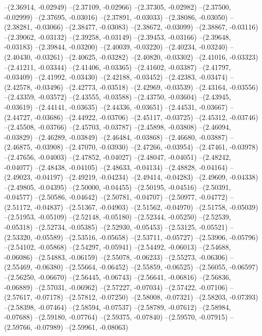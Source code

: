 --(2.36914, -0.02949)
--(2.37109, -0.02966)
--(2.37305, -0.02982)
--(2.37500, -0.02999)
--(2.37695, -0.03016)
--(2.37891, -0.03033)
--(2.38086, -0.03050)
--(2.38281, -0.03066)
--(2.38477, -0.03083)
--(2.38672, -0.03099)
--(2.38867, -0.03116)
--(2.39062, -0.03132)
--(2.39258, -0.03149)
--(2.39453, -0.03166)
--(2.39648, -0.03183)
--(2.39844, -0.03200)
--(2.40039, -0.03220)
--(2.40234, -0.03240)
--(2.40430, -0.03261)
--(2.40625, -0.03282)
--(2.40820, -0.03302)
--(2.41016, -0.03323)
--(2.41211, -0.03344)
--(2.41406, -0.03365)
--(2.41602, -0.03387)
--(2.41797, -0.03409)
--(2.41992, -0.03430)
--(2.42188, -0.03452)
--(2.42383, -0.03474)
--(2.42578, -0.03496)
--(2.42773, -0.03518)
--(2.42969, -0.03539)
--(2.43164, -0.03556)
--(2.43359, -0.03572)
--(2.43555, -0.03588)
--(2.43750, -0.03604)
--(2.43945, -0.03619)
--(2.44141, -0.03635)
--(2.44336, -0.03651)
--(2.44531, -0.03667)
--(2.44727, -0.03686)
--(2.44922, -0.03706)
--(2.45117, -0.03725)
--(2.45312, -0.03746)
--(2.45508, -0.03766)
--(2.45703, -0.03787)
--(2.45898, -0.03808)
--(2.46094, -0.03829)
--(2.46289, -0.03849)
--(2.46484, -0.03868)
--(2.46680, -0.03887)
--(2.46875, -0.03908)
--(2.47070, -0.03930)
--(2.47266, -0.03954)
--(2.47461, -0.03978)
--(2.47656, -0.04003)
--(2.47852, -0.04027)
--(2.48047, -0.04051)
--(2.48242, -0.04077)
--(2.48438, -0.04105)
--(2.48633, -0.04134)
--(2.48828, -0.04164)
--(2.49023, -0.04197)
--(2.49219, -0.04234)
--(2.49414, -0.04283)
--(2.49609, -0.04338)
--(2.49805, -0.04395)
--(2.50000, -0.04455)
--(2.50195, -0.04516)
--(2.50391, -0.04577)
--(2.50586, -0.04642)
--(2.50781, -0.04707)
--(2.50977, -0.04772)
--(2.51172, -0.04837)
--(2.51367, -0.04903)
--(2.51562, -0.04970)
--(2.51758, -0.05039)
--(2.51953, -0.05109)
--(2.52148, -0.05180)
--(2.52344, -0.05250)
--(2.52539, -0.05318)
--(2.52734, -0.05385)
--(2.52930, -0.05453)
--(2.53125, -0.05521)
--(2.53320, -0.05589)
--(2.53516, -0.05658)
--(2.53711, -0.05727)
--(2.53906, -0.05796)
--(2.54102, -0.05868)
--(2.54297, -0.05941)
--(2.54492, -0.06013)
--(2.54688, -0.06086)
--(2.54883, -0.06159)
--(2.55078, -0.06233)
--(2.55273, -0.06306)
--(2.55469, -0.06380)
--(2.55664, -0.06452)
--(2.55859, -0.06525)
--(2.56055, -0.06597)
--(2.56250, -0.06670)
--(2.56445, -0.06743)
--(2.56641, -0.06816)
--(2.56836, -0.06889)
--(2.57031, -0.06962)
--(2.57227, -0.07034)
--(2.57422, -0.07106)
--(2.57617, -0.07178)
--(2.57812, -0.07250)
--(2.58008, -0.07321)
--(2.58203, -0.07393)
--(2.58398, -0.07464)
--(2.58594, -0.07537)
--(2.58789, -0.07612)
--(2.58984, -0.07688)
--(2.59180, -0.07764)
--(2.59375, -0.07840)
--(2.59570, -0.07915)
--(2.59766, -0.07989)
--(2.59961, -0.08063)
